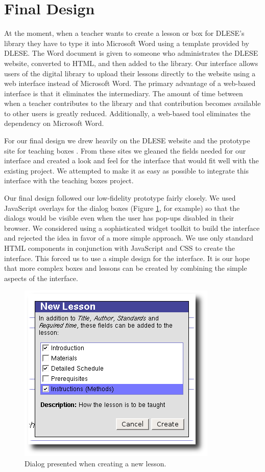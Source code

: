 \documentclass[10pt,letter,titlepage]{article}
\begin{document}
\section{Final Design}
At the moment, when a teacher wants to create a lesson or box for DLESE's
library they have to type it into Microsoft Word using a template provided by
DLESE. The Word document is given to someone who administrates the DLESE
website, converted to HTML, and then added to the library. Our interface allows
users of the digital library to upload their lessons directly to the website
using a web interface instead of Microsoft Word. The primary advantage of a
web-based interface is that it eliminates the intermediary. The amount of time
between when a teacher contributes to the library and that contribution becomes
available to other users is greatly reduced. Additionally, a web-based tool
eliminates the dependency on Microsoft Word.

For our final design we drew heavily on the DLESE website \cite{bib:preview} and
the prototype site for teaching boxes \cite{bib:teachingboxes.org}. From these
sites we gleaned the fields needed for our interface and created a look and feel
for the interface that would fit well with the existing project. We attempted to
make it as easy as possible to integrate this interface with the teaching boxes
project.

Our final design followed our low-fidelity prototype fairly closely. We used
JavaScript overlays for the dialog boxes (Figure \ref{fig: new lesson ss}, for
example) so that the dialogs would be visible even when the user has pop-ups
disabled in their browser. We considered using a sophisticated widget toolkit to
build the interface and rejected the idea in favor of a more simple approach. We
use only standard HTML components in conjunction with JavaScript and CSS to
create the interface. This forced us to use a simple design for the interface.
It is our hope that more complex boxes and lessons can be created by combining
the simple aspects of the interface.

\begin{figure}
	\centering
	\includegraphics[width=0.45\linewidth]{figures/new_lesson}
	\caption{Dialog presented when creating a new lesson.}
	\label{fig: new lesson ss}
\end{figure}
\end{document}
